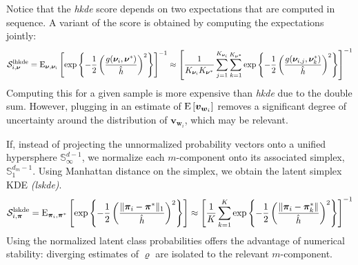 Notice that the \emph{hkde} score depends on two expectations that are computed
in sequence. A variant of the score is obtained by computing the 
    expectations jointly:
    \begin{equation}
        \label{score:cat_lhkde}
        \mathcal{S}_{i,\bm{\nu}}^{\text{lhkde}} = \text{E}_{\bm{\nu},\bm{\nu}_i}\left[
        \exp\left\lbrace
        -\frac{1}{2}\left(
        \frac{g(\bm{\nu}_i, \bm{\nu}^*)}{\hat{h}}
        \right)^2
        \right\rbrace
        \right]^{-1} \approx \left[\frac{1}{K_{\bm{\nu}_i}K_{\bm{\nu}^*}}
            \sum_{j = 1}^{K_{\bm{\nu}_i}}\sum_{k = 1}^{K_{\bm{\nu}^*}}
            \exp\left\lbrace-\frac{1}{2}
                \left(\frac{g(\bm{\nu}_{i,j},\bm{\nu}_{k}^*)}{\hat{h}}\right)^2
                \right\rbrace\right]^{-1}
    \end{equation}
    Computing this for a given sample is more expensive 
    than \emph{hkde} due to the double sum.  However, plugging in an estimate of
    $\text{E}\left[\bm{v}_{\bm{w}_i}\right]$ removes a significant degree of uncertainty around the 
    distribution of $\bm{v}_{\bm{w}_i}$, which may be relevant.

If, instead of projecting the unnormalized probability vectors onto a unified 
    hypersphere $\mathbb{S}_{\infty}^{d-1}$, we normalize each $m$-component 
    onto its associated simplex, $\mathbb{S}_1^{d_m - 1}$.  Using Manhattan distance on the simplex, we 
    obtain the latent simplex KDE \emph{(lskde)}.
    \begin{equation}
        \label{score:cat_lskde}
        \mathcal{S}_{i,\bm{\pi}}^{\text{lskde}} = \text{E}_{\bm{\pi}_i,\bm{\pi}^*}\left[\exp\left\lbrace
        -\frac{1}{2}\left(
        \frac{\lVert \bm{\pi}_i - \bm{\pi}^*\rVert_1}{\hat{h}}
        \right)^2
        \right\rbrace
        \right]
        \approx \left[
            \frac{1}{K}\sum_{k = 1}^K\exp\left\lbrace
            -\frac{1}{2}\left(\frac{\lVert \bm{\pi}_i - \bm{\pi}_k^*\rVert}{\hat{h}}\right)^2
            \right\rbrace
        \right]^{-1}
    \end{equation}
    Using the normalized latent class probabilities offers the advantage of
    numerical stability: diverging estimates of $\varrho$ are isolated to the
    relevant $m$-component.

